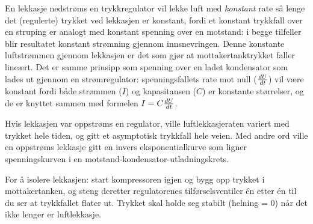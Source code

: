 
En lekkasje nedstrøms en trykkregulator vil lekke luft med {\it konstant} rate så lenge det (regulerte) trykket ved lekkasjen er konstant, fordi et konstant trykkfall over en struping er analogt med konstant spenning over en motstand: i begge tilfeller blir resultatet konstant strømning gjennom innsnevringen. Denne konstante luftstrømmen gjennom lekkasjen er det som gjør at mottakertanktrykket faller lineært. Det er samme prinsipp som spenning over en ladet kondensator som lades ut gjennom en strømregulator: spenningsfallets rate mot null ($dU \over dt$) vil være konstant fordi både strømmen ($I$) og kapasitansen ($C$) er konstante størrelser, og de er knyttet sammen med formelen $I = C {dU \over dt}$.

Hvis lekkasjen var oppstrøms en regulator, ville luftlekkasjeraten variert med trykket hele tiden, og gitt et asymptotisk trykkfall hele veien. Med andre ord ville en oppstrøms lekkasje gitt en invers eksponentialkurve som ligner spenningskurven i en motstand-kondensator-utladningskrets.

\vskip 10pt

For å isolere lekkasjen: start kompressoren igjen og bygg opp trykket i mottakertanken, og steng deretter regulatorenes tilførselsventiler én etter én til du ser at trykkfallet flater ut. Trykket skal holde seg stabilt (helning = 0) når det ikke lenger er luftlekkasje.



